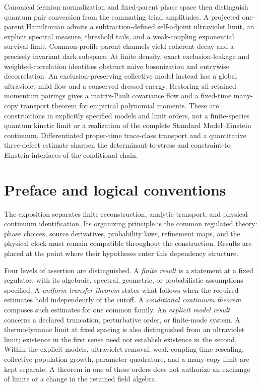 \documentclass[11pt,a4paper,oneside]{book}
\theoremstyle{plain}
\theoremstyle{definition}
\theoremstyle{remark}
\begin{document}
Canonical fermion normalization and fixed-parent phase space then distinguish quantum pair conversion from the commuting triad amplitudes.  A projected one-parent Hamiltonian admits a subtraction-defined self-adjoint ultraviolet limit, an explicit spectral measure, threshold tails, and a weak-coupling exponential survival limit.  Common-profile parent channels yield coherent decay and a precisely invariant dark subspace.  At finite density, exact exclusion-leakage and weighted-correlation identities obstruct naive bosonization and entrywise decorrelation.  An exclusion-preserving collective model instead has a global ultraviolet mild flow and a conserved dressed energy.  Restoring all retained momentum pairings gives a matrix-Pauli covariance flow and a fixed-time many-copy transport theorem for empirical polynomial moments.  These are constructions in explicitly specified models and limit orders, not a finite-species quantum kinetic limit or a realization of the complete Standard Model--Einstein continuum.  Differentiated proper-time trace-class transport and a quantitative three-defect estimate sharpen the determinant-to-stress and constraint-to-Einstein interfaces of the conditional chain.

\chapter*{Preface and logical conventions}
The exposition separates finite reconstruction, analytic transport, and
physical continuum identification.  Its organizing principle is the common
regulated theory: phase choices, source derivatives, probability laws,
refinement maps, and the physical clock must remain compatible throughout
the construction.  Results are placed at the point where their hypotheses
enter this dependency structure.

Four levels of assertion are distinguished.  A \emph{finite result} is a
statement at a fixed regulator, with its algebraic, spectral, geometric, or
probabilistic assumptions specified.  A \emph{uniform transfer theorem}
states what follows when the required estimates hold independently of the
cutoff.  A \emph{conditional continuum theorem} composes such estimates for
one common family.  An \emph{explicit model result} concerns a declared
truncation, perturbative order, or finite-mode system.  A thermodynamic
limit at fixed spacing is also distinguished from an ultraviolet limit;
existence in the first sense need not establish existence in the second.
Within the explicit models, ultraviolet removal, weak-coupling time
rescaling, collective population growth, parameter quadrature, and a
many-copy limit are kept separate.  A theorem in one of these orders
does not authorize an exchange of limits or a change in the retained
field algebra.
\end{document}
